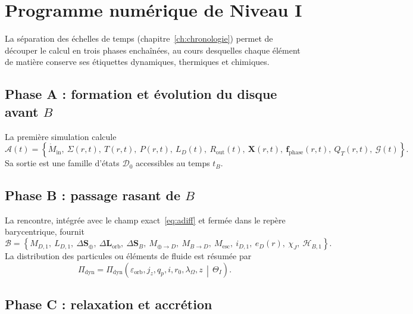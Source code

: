 \documentclass[11pt,a4paper,openany]{report}
\begin{document}
\chapter{Programme numérique de Niveau I}
\label{ch:programme}

La séparation des échelles de temps (chapitre~\ref{ch:chronologie}) permet de découper le calcul en
trois phases enchaînées, au cours desquelles chaque élément de matière conserve ses étiquettes
dynamiques, thermiques et chimiques.

\section{Phase A : formation et évolution du disque avant \texorpdfstring{$B$}{B}}

La première simulation calcule
\begin{equation}
\mathcal{A}(t)=\left\{\dot M_{\mathrm{in}},\ \Sigma(r,t),\ T(r,t),\ P(r,t),\ L_D(t),\
R_{\mathrm{out}}(t),\ \mathbf{X}(r,t),\ \mathbf{f}_{\mathrm{phase}}(r,t),\ Q_T(r,t),\ \mathcal{G}(t)\right\}.
\label{eq:phaseA}
\end{equation}
Sa sortie est une famille d'états $\mathcal{D}_0$ accessibles au temps $t_B$.

\section{Phase B : passage rasant de \texorpdfstring{$B$}{B}}

La rencontre, intégrée avec le champ exact~\eqref{eq:adiff} et fermée dans le repère
barycentrique, fournit
\begin{equation}
\mathcal{B}=\left\{M_{D,1},\ L_{D,1},\ \Delta\mathbf{S}_\oplus,\ \Delta\mathbf{L}_{\mathrm{orb}},\
\Delta\mathbf{S}_B,\ M_{\oplus\to D},\ M_{B\to D},\ M_{\mathrm{esc}},\ i_{D,1},\ e_D(r),\ \chi_J,\ \mathcal{H}_{B,1}\right\}.
\label{eq:phaseB}
\end{equation}
La distribution des particules ou éléments de fluide est résumée par
\begin{equation}
\Pi_{\mathrm{dyn}}=\Pi_{\mathrm{dyn}}\left(\varepsilon_{\mathrm{orb}},j_z,q_p,i,r_0,\lambda_\Omega,z
\,\middle|\,\Theta_I\right).
\label{eq:Pidyn}
\end{equation}

\section{Phase C : relaxation et accrétion}
\end{document}
